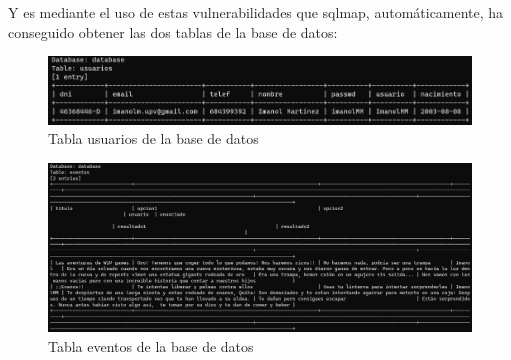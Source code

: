 \documentclass{report}
\begin{document}
                \clearpage
                Y es mediante el uso de estas vulnerabilidades que sqlmap, automáticamente, ha conseguido obtener las dos tablas de la base de datos:
                \begin{figure}[H]
                    \centering
                    \includegraphics[width=1\textwidth]{./img/vulnerabilidades/2.3/1.2.png}
                    \caption{Tabla usuarios de la base de datos}
                \end{figure}
                \begin{figure}[H]
                    \centering
                    \includegraphics[width=1\textwidth]{./img/vulnerabilidades/2.3/1.3.png}
                    \caption{Tabla eventos de la base de datos}
                \end{figure}
                \clearpage
\end{document}
